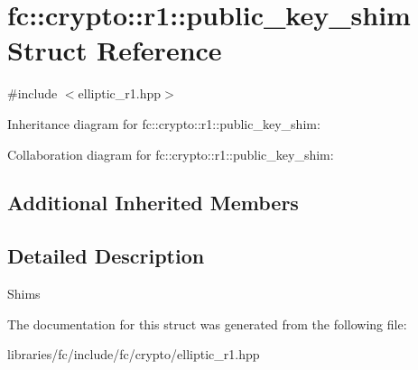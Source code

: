 \hypertarget{structfc_1_1crypto_1_1r1_1_1public__key__shim}{}\section{fc\+:\+:crypto\+:\+:r1\+:\+:public\+\_\+key\+\_\+shim Struct Reference}
\label{structfc_1_1crypto_1_1r1_1_1public__key__shim}


{\ttfamily \#include $<$elliptic\+\_\+r1.\+hpp$>$}



Inheritance diagram for fc\+:\+:crypto\+:\+:r1\+:\+:public\+\_\+key\+\_\+shim\+:


Collaboration diagram for fc\+:\+:crypto\+:\+:r1\+:\+:public\+\_\+key\+\_\+shim\+:
\subsection*{Additional Inherited Members}


\subsection{Detailed Description}
Shims 

The documentation for this struct was generated from the following file\+:\begin{DoxyCompactItemize}
\item 
libraries/fc/include/fc/crypto/elliptic\+\_\+r1.\+hpp\end{DoxyCompactItemize}
